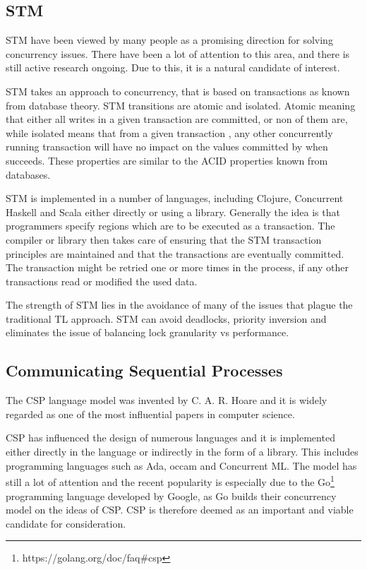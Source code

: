 \subsection{\acl{STM}}
\ac{STM} have been viewed by many people as a promising direction for solving concurrency issues\cite{sutter2005software}. There have been a lot of attention to this area, and there is still active research ongoing. Due to this, it is a natural candidate of interest.

\ac{STM} takes an approach to concurrency, that is based on transactions as known from database theory\cite[p. 1]{shavit1997software}. \ac{STM} transitions are atomic and isolated. Atomic meaning that either all writes in a given transaction are committed, or non of them are, while isolated means that from a given transaction , any other concurrently running transaction will have no impact on the values committed by  when  succeeds\cite[p. 102]{sevenModels}. These properties are similar to the \ac{ACID} properties known from databases\cite[p. 754]{elmasri2011fundamentals}.

\ac{STM} is implemented in a number of languages, including Clojure\cite[p. 101]{sevenModels}, Concurrent Haskell\cite{harris2005composable} and Scala\cite{goodman2011muts} either directly or using a library. Generally the idea is that programmers specify regions which are to be executed as a transaction. The compiler or library then takes care of ensuring that the \ac{STM} transaction principles are maintained and that the transactions are eventually committed\cite[p. 1]{saha2006mcrt}. The transaction might be retried one or more times in the process, if any other transactions read or modified the used data.

The strength of \ac{STM} lies in the avoidance of many of the issues that plague the traditional \ac{TL} approach. \ac{STM} can avoid deadlocks, priority inversion and eliminates the issue of balancing lock granularity vs performance\cite[p. 1]{harris2005composable}.

\subsection{Communicating Sequential Processes}
The \ac{CSP} language model was invented by C. A. R. Hoare and it is widely regarded as one of the most influential papers in computer science\cite{abdallah2005communicating}. 

\ac{CSP} has influenced the design of numerous languages and it is implemented either directly in the language or indirectly in the form of a library. This includes programming languages such as Ada, occam and Concurrent ML\cite{abdallah2005communicating}. The model has still a lot of attention and the recent popularity is especially due to the Go\footnote{https://golang.org/doc/faq\#csp} programming language developed by Google, as Go builds their concurrency model on the ideas of \ac{CSP}\cite[Chap. 6]{sevenModels}. \ac{CSP} is therefore deemed as an important and viable candidate for consideration.

